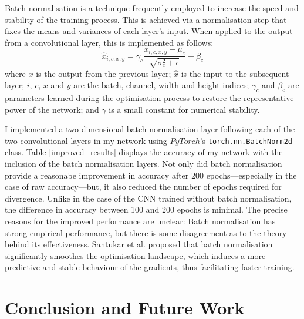 \documentclass[conference]{IEEEtran}
\begin{document}
Batch normalisation \cite{IoffeSzegedy} is a technique frequently employed to increase the speed and stability of the training process.
This is achieved via a normalisation step that fixes the means and variances of each layer's input.
When applied to the output from a convolutional layer, this is implemented as follows:
\[
\hat{x}_{i,c,x,y}=\gamma_c\frac{x_{i,c,x,y}-\mu_c}{\sqrt{\sigma_c^2+\epsilon}}+\beta_c
\]
where $x$ is the output from the previous layer; $\hat{x}$ is the input to the subsequent layer; $i$, $c$, $x$ and $y$ are the batch, channel, width and height indices; $\gamma_c$ and $\beta_c$ are parameters learned during the optimisation process to restore the representative power of the network; and $\gamma$ is a small constant for numerical stability.

I implemented a two-dimensional batch normalisation layer following each of the two convolutional layers in my network using $PyTorch$'s \texttt{torch.nn.BatchNorm2d} class.
Table \ref{improved_results} displays the accuracy of my network with the inclusion of the batch normalisation layers.
Not only did batch normalisation provide a reasonabe improvement in accuracy after 200 epochs---especially in the case of raw accuracy---but, it also reduced the number of epochs required for divergence.
Unlike in the case of the CNN trained without batch normalisation, the difference in accuracy between 100 and 200 epochs is minimal.
The precise reasons for the improved performance are unclear: Batch normalisation has strong empirical performance, but there is some disagreement as to the theory behind its effectiveness.
Santukar et al. \cite{SanturkarEtAl} proposed that batch normalisation significantly smoothes the optimisation landscape, which induces a more predictive and stable behaviour of the gradients, thus facilitating faster training.

\section{Conclusion and Future Work}





\end{document}
